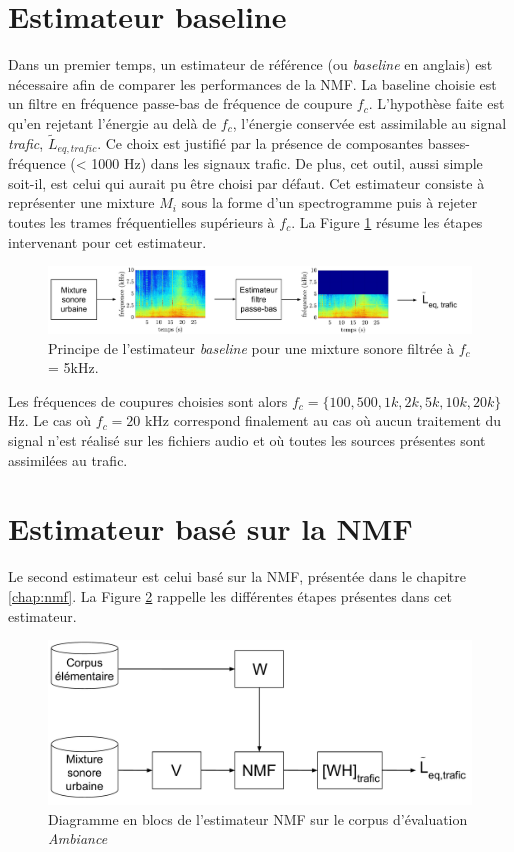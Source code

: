\section{Estimateur baseline}
Dans un premier temps, un estimateur de référence (ou \textit{baseline} en anglais) est nécessaire afin de comparer les performances de la NMF. La baseline choisie est un filtre en fréquence passe-bas de fréquence de coupure $f_c$. L'hypothèse faite est qu'en rejetant l'énergie au delà de $f_c$, l'énergie conservée est assimilable au signal \textit{trafic}, $\tilde{L}_{eq,trafic}$. Ce choix est justifié par la présence de composantes basses-fréquence (< 1000 Hz) dans les signaux trafic. De plus, cet outil, aussi simple soit-il, est celui qui aurait pu être choisi par défaut.
Cet estimateur consiste à représenter une mixture $M_i$ sous la forme d'un spectrogramme puis à rejeter toutes les trames fréquentielles supérieurs à $f_c$. La Figure \ref{fig:baseline} résume les étapes intervenant pour cet estimateur.

\begin{figure}[hbtp]
\centering
\includegraphics[width=\linewidth]{./figures/NMF/filtre_principe.pdf}
\caption{Principe de l'estimateur \textit{baseline}  pour une mixture sonore filtrée à $f_c$ = 5kHz.}
\label{fig:baseline}
\end{figure}

Les fréquences de coupures choisies sont alors $f_c = \lbrace 100, 500, 1k, 2k, 5k, 10k, 20k \rbrace$ Hz. Le cas où $f_c = 20$ kHz correspond finalement au cas où aucun traitement du signal n'est réalisé sur les fichiers audio et où toutes les sources présentes sont assimilées au trafic.

\section{Estimateur basé sur la NMF}
Le second estimateur est celui basé sur la NMF, présentée dans le chapitre \ref{chap:nmf}. La Figure \ref{fig:nmf_ambiance} rappelle les différentes étapes présentes dans cet estimateur.

\begin{figure}[ht]
\centering
\includegraphics[width=0.7\linewidth]{./figures/NMF/NMF_ambiance.pdf}
\caption{Diagramme en blocs de l'estimateur NMF sur le corpus d'évaluation \textit{Ambiance}}
\label{fig:nmf_ambiance}
\end{figure}


